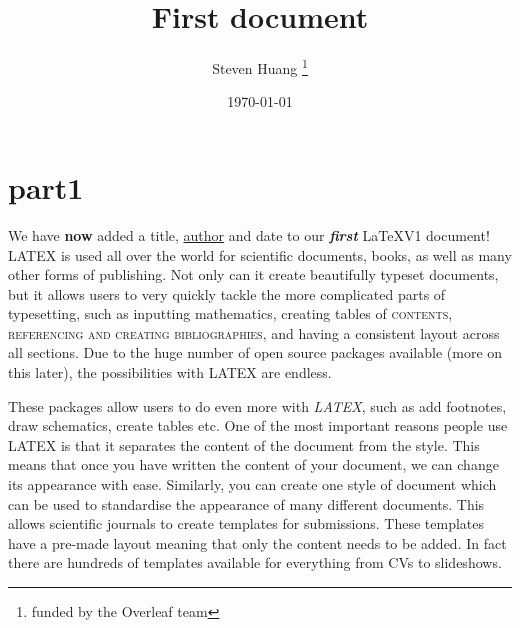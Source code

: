 \documentclass[10pt, a4paper,twocolumn,notitlepage]{article} %
\title{First document}
\author{Steven Huang \thanks{funded by the Overleaf team}}
\date{\today}
\begin{document}
\maketitle


\section{part1}
We have \textbf{now} added a title, \underline{author} and date to our \textbf{\textit{first}}  \LaTeX{V1} document!  LATEX is used all over the world for scientific documents, books, as well as many other forms of publishing. {\tiny Not only can it create beautifully} typeset documents, but it allows users to very quickly tackle the more complicated parts of typesetting, such as inputting mathematics, creating tables of \textsc{contents, referencing and creating bibliographies}, and having a consistent layout across all sections. Due to the huge number of open source packages available (more on this later), the possibilities with {\huge LATEX} are endless. \par These {\footnotesize packages allow users} to do even more with \Large{\textit{LATEX}}, such as add footnotes, draw schematics, create tables etc. One of the most important reasons people use LATEX is that it separates the content of the document from the style. This means that once you have written the content of your document, we can change its appearance with ease. Similarly, you can create one style of document which can be used to standardise the appearance of many different documents. This allows scientific journals to create templates for submissions. These templates have a pre-made layout meaning that only the content needs to be added. In fact there are hundreds of templates available for everything from CVs to slideshows.
\end{document}
